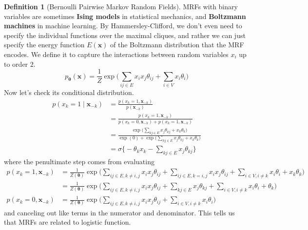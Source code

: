 \documentclass{article}
\theoremstyle{definition}
\theoremstyle{remark}
\theoremstyle{definition}
\newtheorem{definition}{Definition}[section]
\begin{document}
\begin{definition}[Bernoulli Pairwise Markov Random Fields]
    MRFs with binary variables are sometimes \textbf{Ising models} in statistical mechanics, and \textbf{Boltzmann machines} in machine learning. By Hammersley-Clifford, we don't even need to specify the individual functions over the maximal cliques, and rather we can just specify the energy function $E(\mathbf{x})$ of the Boltzmann distribution that the MRF encodes. We define it to capture the interactions between random variables $x_i$ up to order $2$. 
\[p_{\boldsymbol{\theta}} (\mathbf{x}) = \frac{1}{Z} \exp \bigg( \sum_{ij \in E} x_i x_j \theta_{ij} + \sum_{i \in V} x_i \theta_i \bigg) \]
Now let's check its conditional distribution. 
\begin{align*}
    p(x_k = 1 \mid \mathbf{x}_{-k}) & = \frac{p(x_k = 1, \mathbf{x}_{-k})}{p(\mathbf{x}_{-k})} \\
                                    & = \frac{p(x_k = 1, \mathbf{x}_{-k})}{p(x_k = 0, \mathbf{x}_{-k}) + p(x_k = 1, \mathbf{x}_{-k})} \\
                                    & = \frac{\exp \Big( \sum_{k j \in E} x_j \theta_{kj} + x_k \theta_k \Big)}{\exp(0) + \exp \Big(\sum_{k j \in E} x_j \theta_{kj} + x_k \theta_k \Big)} \\
                                    & = \sigma \bigg\{ - \theta_k x_k - \sum_{k j \in E} x_j \theta_{k j} \bigg\} 
\end{align*}
where the penultimate step comes from evaluating 
\begin{align*} 
    p(x_k = 1, \mathbf{x}_{-k}) & = \frac{1}{Z(\boldsymbol{\theta})} \exp \bigg( \sum_{ij \in E, k \neq i, j} x_i x_j \theta_{ij} + \sum_{i j \in E, k = i, j} x_i x_j \theta_{ij} + \sum_{i \in V, i \neq k} x_i \theta_i + x_k \theta_k \bigg) \\
                                & =\frac{1}{Z(\boldsymbol{\theta})} \exp \bigg( \sum_{ij \in E, k \neq i, j} x_i x_j \theta_{ij} + \sum_{k j \in E} x_j \theta_{kj} + \sum_{i \in V, i \neq k} x_i \theta_i + \theta_k \bigg)  \\ 
    p(x_k = 0, \mathbf{x}_{-k}) & = \frac{1}{Z(\boldsymbol{\theta})} \exp \bigg( \sum_{ij \in E, k \neq i, j} x_i x_j \theta_{ij} + \sum_{i \in V, i \neq k} x_i \theta_i\bigg)  
\end{align*}
and canceling out like terms in the numerator and denominator. This tells us that MRFs are related to logistic function.  
\end{definition}
\end{document}
